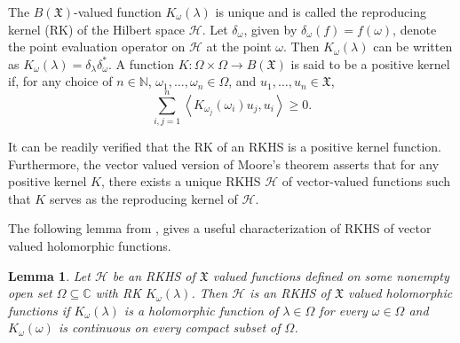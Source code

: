 \documentclass [12pt,reqno]{amsart}
\numberwithin{equation}{subsection}
\newtheorem{lemma}[thm]{Lemma}
\numberwithin{equation}{section}
\begin{document}
The \( B(\mathfrak{X}) \)-valued function \( K_{\omega}(\lambda) \) is unique and is called the reproducing kernel (RK) of the Hilbert space \( \mathcal{H} \). Let \( \delta_{\omega} \), given by \( \delta_{\omega}(f) = f(\omega) \), denote the point evaluation operator on \( \mathcal{H} \) at the point \( \omega \). Then \( K_{\omega}(\lambda) \) can be written as \( K_{\omega}(\lambda) = \delta_{\lambda} \delta_{\omega}^* \). A function \( K : \Omega \times \Omega \rightarrow B(\mathfrak{X}) \) is said to be a positive kernel if, for any choice of \( n \in \mathbb{N} \), \( \omega_{1}, \ldots, \omega_n \in \Omega \), and \( u_1, \ldots, u_n \in \mathfrak{X} \),
\begin{equation*}
\sum_{i,j=1}^{n} \left\langle K_{\omega_j} (\omega_i) u_j , u_i \right\rangle \geqslant 0.
\end{equation*}

It can be readily verified that the RK of an RKHS is a positive kernel function. Furthermore, the vector valued version of Moore's theorem \cite[Theorem 6.12]{Paulsen} asserts that for any positive kernel \(K\), there exists a unique RKHS \(\mathcal{H}\) of vector-valued functions such that \(K\) serves as the reproducing kernel of \(\mathcal{H}\).

The following lemma from \cite[Lemma 5.6]{ArD08}, gives a useful characterization of RKHS of vector valued holomorphic functions.
\begin{lemma}\label{Lemma 2.1}
Let $\mathcal{H}$ be an RKHS of $\mathfrak{X}$ valued functions defined on some nonempty open set $\Omega \subseteq \mathbb{C}$ with RK $K_{\omega}(\lambda)$. Then $\mathcal{H}$ is an RKHS of $\mathfrak{X}$ valued holomorphic functions if $K_{\omega}(\lambda)$ is a holomorphic function of $\lambda \in \Omega$ for every $\omega \in \Omega$ and $K_{\omega}(\omega)$ is continuous on every compact subset of $\Omega$.
\end{lemma}
\end{document}
